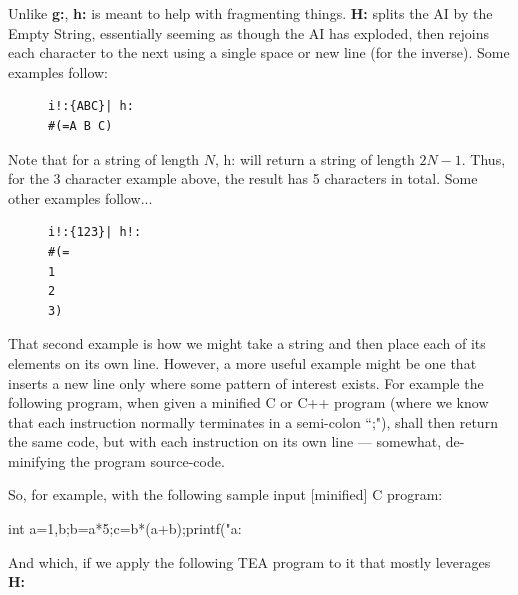 \documentclass[a4paper, 18pt]{book} %
\begin{document}
Unlike \textbf{g:}, \textbf{h:} is meant to help with fragmenting things. \textbf{H:} splits the AI by the Empty String, essentially seeming as though the AI has exploded, then rejoins each character to the next using a single space or new line (for the inverse). Some examples follow:


\begin{figure}[H]
 \Large
  \centering
  \begin{tcolorbox}[teaterminalstyle, title=H: EXAMPLE 1]
  \begin{lstlisting}[language=TEA]
i!:{ABC}| h:
#(=A B C) 
   \end{lstlisting}
  \end{tcolorbox}
\end{figure}


Note that for a string of length $N$, h: will return a string of length $2N - 1$. Thus, for the 3 character example above, the result has 5 characters in total. Some other examples follow...


\begin{figure}[H]
 \Large
  \centering
  \begin{tcolorbox}[teaterminalstyle, title=H: EXAMPLE 2]
  \begin{lstlisting}[language=TEA]
i!:{123}| h!:
#(=
1
2
3)
   \end{lstlisting}
  \end{tcolorbox}
\end{figure}


That second example is how we might take a string and then place each of its elements on its own line. However, a more useful example might be one that inserts a new line only where some pattern of interest exists. For example the following program, when given a minified C or C++ program (where we know that each instruction normally terminates in a semi-colon ``;"), shall then return the same code, but with each instruction on its own line --- somewhat, de-minifying the program source-code.

So, for example, with the following sample input [minified] C program:


  \begin{tcbverbatim}[title=Sample Input Minified C Program]
int a=1,b;b=a*5;c=b*(a+b);printf("a:%
  \end{tcbverbatim}



And which, if we apply the following TEA program to it that mostly leverages \textbf{H:}
\end{document}
